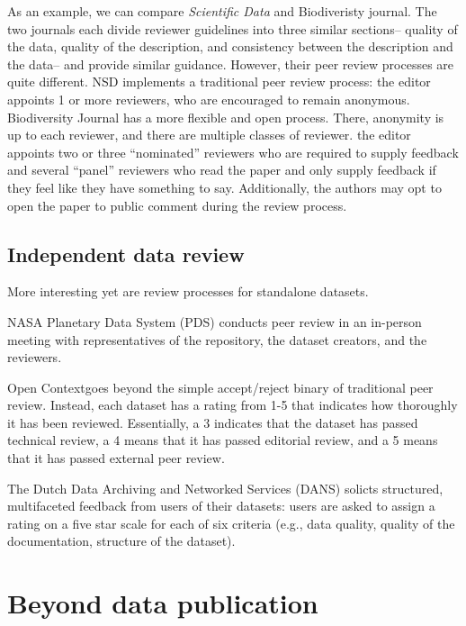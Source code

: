 \documentclass[10pt,a4paper,twocolumn]{article}
\begin{document}
As an example, we can compare \emph{Scientific Data} and Biodiveristy journal.
The two journals each divide reviewer guidelines into three similar sections– quality of the data, quality of the description, and consistency between the description and the data– and provide similar guidance.
However, their peer review processes are quite different.
NSD implements a traditional peer review process: the editor appoints 1 or more reviewers, who are encouraged to remain anonymous.
Biodiversity Journal has a more flexible and open process.
There, anonymity is up to each reviewer, and there are multiple classes of reviewer.
the editor appoints two or three ``nominated'' reviewers who are required to supply feedback and several ``panel'' reviewers who read the paper and only supply feedback if they feel like they have something to say.
Additionally, the authors may opt to open the paper to public comment during the review process.


\subsection*{Independent data review}
More interesting yet are review processes for standalone datasets. 

NASA Planetary Data System (PDS) conducts peer review in an in-person meeting with representatives of the repository, the dataset creators, and the reviewers. 

Open Context\href{http://opencontext.org/} goes beyond the simple accept/reject binary of traditional peer review.\cite{kansa_we_2013} 
Instead, each dataset has a rating from 1-5 that indicates how thoroughly it has been reviewed. 
Essentially, a 3 indicates that the dataset has passed technical review, a 4 means that it has passed editorial review, and a 5 means that it has passed external peer review. 


The Dutch Data Archiving and Networked Services (DANS) solicts structured, multifaceted feedback from users of their datasets: users are asked to assign a rating on a five star scale for each of six criteria (e.g., data quality, quality of the documentation, structure of the dataset).\cite{grootveld_data_2011,grootveld_peer-reviewed_2012} 



\section*{Beyond data publication}\label{beyond-data-publication}
\end{document}

